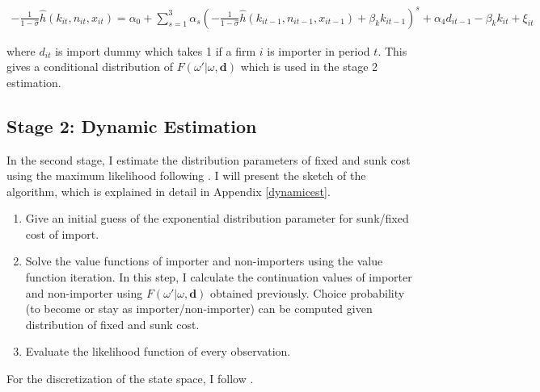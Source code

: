 \documentclass[11pt,letter]{article}
\newcommand{\vect}[1]{\boldsymbol{\mathbf{#1}}}
\newcommand{\prn}[1]{\left({#1}\right)}
\begin{document}
\begin{align*}
 - \frac{1}{1-\hat{\sigma}} \hat{h}(k_{it},n_{it}, x_{it})=  \alpha_0 + \sum_{s=1}^3 \alpha_s \prn{  - \frac{1}{1-\hat{\sigma}} \hat{h}(k_{it-1},n_{it-1}, x_{it-1}) + \beta_k k_{it-1} }^s + \alpha_4 d_{it-1} - \beta_k k_{it}  + \xi_{it} 
\end{align*}

\noindent where $d_{it}$ is import dummy which takes 1 if a firm $i$ is importer in period $t$. This gives a conditional distribution of $F(\omega'|\omega,\vect{d})$ which is used in the stage 2 estimation.

\subsection*{Stage 2: Dynamic Estimation}

In the second stage, I estimate the distribution parameters of fixed and sunk cost using the maximum likelihood following \citet{Bai2017}. I will present the sketch of the algorithm, which is explained in detail in Appendix \ref{dynamicest}. 

\begin{enumerate}
    \item Give an initial guess of the exponential distribution parameter for sunk/fixed cost of import.
    \item Solve the value functions of importer and non-importers using the value function iteration. In this step, I calculate the continuation values of importer and non-importer using  $F(\omega'|\omega,\vect{d})$ obtained previously. Choice probability (to become or stay as importer/non-importer) can be computed given distribution of fixed and sunk cost. 
\item Evaluate the likelihood function of every observation.
\end{enumerate}

\noindent For the discretization of the state space, I follow \citet{Aw2011}.




\newpage
\end{document}
